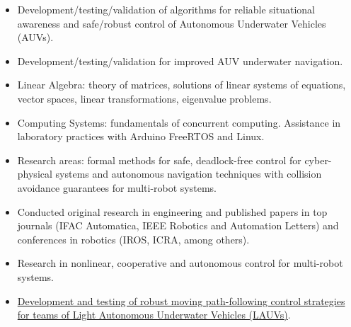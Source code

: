 
\begin{itemize}
\item Development/testing/validation of algorithms for reliable situational awareness and safe/robust control of Autonomous Underwater Vehicles (AUVs).
\item Development/testing/validation for improved AUV underwater navigation.
\end{itemize}

\begin{itemize}
	\item Linear Algebra: theory of matrices, solutions of linear systems of equations, vector spaces, linear transformations, eigenvalue problems.
	\item Computing Systems: fundamentals of concurrent computing. Assistance in laboratory practices with Arduino FreeRTOS and Linux.
\end{itemize}

\begin{itemize}
\item Research areas: formal methods for safe, deadlock-free control for cyber-physical systems and autonomous navigation techniques with collision avoidance guarantees for multi-robot systems.
\item Conducted original research in engineering and published papers in top journals (IFAC Automatica, IEEE Robotics and Automation Letters) and conferences in robotics (IROS, ICRA, among others).
\end{itemize}

\begin{itemize}
\item Research in nonlinear, cooperative and autonomous control for multi-robot systems.
\item \href{https://lsts.fe.up.pt/news/meet-matheus-f-reis}{Development and testing of robust moving path-following control strategies for teams of Light Autonomous Underwater Vehicles (LAUVs)}.
\end{itemize}

